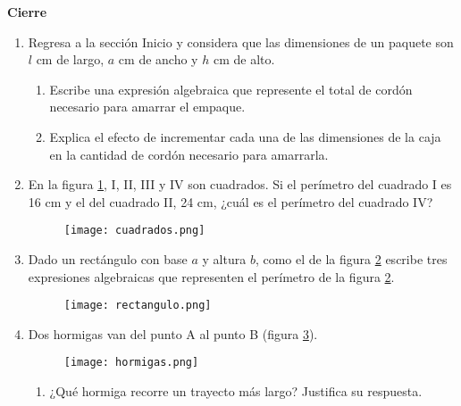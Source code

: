 \begin{enumerate}
\end{enumerate}

\begin{boxK}
    \begin{center}\textbf{Cierre}\end{center}

    \begin{enumerate}
        \item Regresa a la sección Inicio y considera que las dimensiones de un paquete son $l$ cm de largo, $a$ cm de ancho y $h$ cm de alto.
              \begin{enumerate}
                  \item Escribe una expresión algebraica que represente el total
                        de cordón necesario para amarrar el empaque.
                  \item Explica el efecto de incrementar cada una de las dimensiones de la caja en la cantidad de cordón necesario
                        para amarrarla.
              \end{enumerate}
        \item En la figura \ref{fig:cuadrados}, I, II, III y IV son cuadrados. Si el perímetro del cuadrado I es 16 cm y
              el del cuadrado II, 24 cm, ¿cuál es el perímetro del cuadrado IV?
              \begin{figure}[H]
                  \centering
                  \texttt{[image: cuadrados.png]}
                  \label{fig:cuadrados}
              \end{figure}
        \item Dado un rectángulo con base $a$ y altura $b$, como el de la figura \ref{fig:rectangulo}
              escribe tres expresiones algebraicas que
              representen el perímetro de la figura \ref{fig:rectangulo}.
              \begin{figure}[H]
                  \centering
                  \texttt{[image: rectangulo.png]}
                  \label{fig:rectangulo}
              \end{figure}
        \item Dos hormigas van del punto A al punto B (figura \ref{fig:hormigas}).
              \begin{figure}[H]
                  \centering
                  \texttt{[image: hormigas.png]}
                  \label{fig:hormigas}
              \end{figure}
              \begin{enumerate}
                  \item ¿Qué hormiga recorre un trayecto más largo? Justifica su respuesta.
              \end{enumerate}
    \end{enumerate}
\end{boxK}


